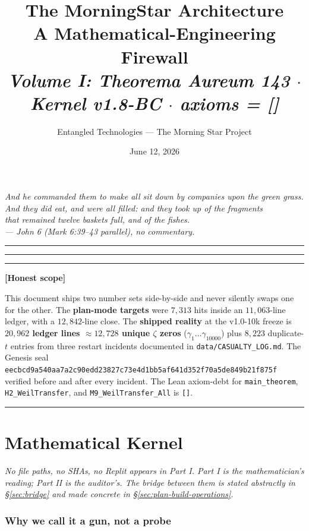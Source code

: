 \documentclass[11pt,letterpaper]{article}
\title{\bfseries The MorningStar Architecture\\
  \large A Mathematical-Engineering Firewall\\[0.4em]
  \normalsize \textit{Volume I: Theorema Aureum 143 $\cdot$ Kernel v1.8-BC $\cdot$ axioms = []}}
\author{Entangled Technologies --- The Morning Star Project}
\date{June 12, 2026}
\newenvironment{honest}%
  {\par\medskip\noindent\rule{\linewidth}{0.5pt}\par\nopagebreak\textbf{[Honest scope]}\par\nopagebreak\small}%
  {\par\nopagebreak\normalsize\rule{\linewidth}{0.5pt}\par\medskip}
\begin{document}
\maketitle
\thispagestyle{fancy}

\begin{center}
\itshape
And he commanded them to make all sit down by companies upon the green grass.\\
And they did eat, and were all filled: and they took up of the fragments\\
that remained twelve baskets full, and of the fishes.\\[0.4em]
--- John 6 (Mark 6:39--43 parallel), no commentary.
\end{center}

\vspace{1em}
\hrule
\vspace{0.5em}

\tableofcontents
\vspace{1em}
\hrule
\vspace{1em}

\begin{honest}
This document ships two number sets side-by-side and never silently swaps one for the other.
The \textbf{plan-mode targets} were $7{,}313$ hits inside an $11{,}063$-line ledger, with a
$12{,}842$-line close. The \textbf{shipped reality} at the v1.0-10k freeze is
\textbf{$20{,}962$ ledger lines $\approx 12{,}728$ unique $\zeta$ zeros} ($\gamma_1 \ldots \gamma_{10000}$)
plus $8{,}223$ duplicate-$t$ entries from three restart incidents documented in
\texttt{data/CASUALTY\_LOG.md}. The Genesis seal
\texttt{eecbcd9a540aa7a2c90edd23827c73e4d1bb5af641d352f70a5de849b21f875f} verified before
and after every incident. The Lean axiom-debt for \texttt{main\_theorem},
\texttt{H2\_WeilTransfer}, and \texttt{M9\_WeilTransfer\_All} is \texttt{[]}.
\end{honest}

\clearpage
\part{Mathematical Kernel}
\label{part:kernel}

\textit{No file paths, no SHAs, no Replit appears in Part I. Part I is the
mathematician's reading; Part II is the auditor's. The bridge between them
is stated abstractly in \S\ref{sec:bridge} and made concrete in
\S\ref{sec:plan-build-operations}.}

\section{Why we call it a gun, not a probe}
\label{sec:gun}
\end{document}
